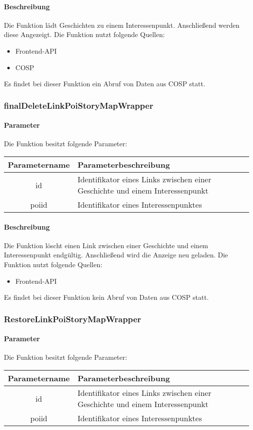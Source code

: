 \paragraph{Beschreibung} Die Funktion lädt Geschichten zu einem Interessenpunkt. Anschließend werden diese Angezeigt. Die Funktion nutzt folgende Quellen:
\begin{itemize}
	\item Frontend-API
	\item COSP
\end{itemize}
Es findet bei dieser Funktion ein Abruf von Daten aus {\glqq COSP\grqq} statt.
\subsubsection{finalDeleteLinkPoiStoryMapWrapper}
\paragraph{Parameter} Die Funktion besitzt folgende Parameter:
\begin{table}[H]
	\begin{tabular}{|c|p{11cm}|}
		\hline
		\textbf{Parametername} & \textbf{Parameterbeschreibung} \\ \hline
		id    & Identifikator eines Links zwischen einer Geschichte und einem Interessenpunkt \\ \hline
		poiid & Identifikator eines Interessenpunktes \\ \hline
	\end{tabular}
\end{table}
\paragraph{Beschreibung} Die Funktion löscht einen Link zwischen einer Geschichte und einem Interessenpunkt endgültig. Anschließend wird die Anzeige neu geladen. Die Funktion nutzt folgende Quellen:
\begin{itemize}
	\item Frontend-API
\end{itemize}
Es findet bei dieser Funktion kein Abruf von Daten aus {\glqq COSP\grqq} statt.
\subsubsection{RestoreLinkPoiStoryMapWrapper}
\paragraph{Parameter} Die Funktion besitzt folgende Parameter:
\begin{table}[H]
	\begin{tabular}{|c|p{11cm}|}
		\hline
		\textbf{Parametername} & \textbf{Parameterbeschreibung} \\ \hline
		id    & Identifikator eines Links zwischen einer Geschichte und einem Interessenpunkt \\ \hline
		poiid & Identifikator eines Interessenpunktes \\ \hline
	\end{tabular}
\end{table}
